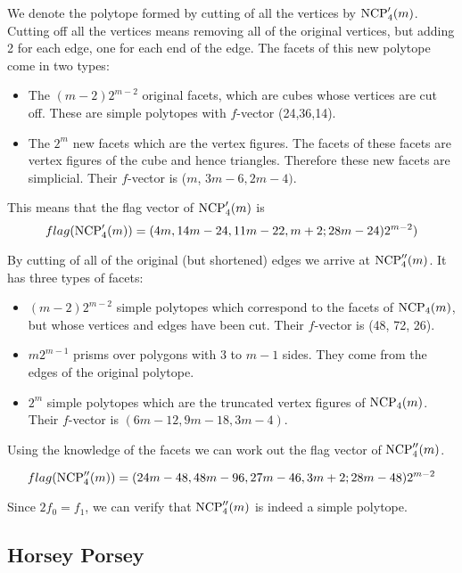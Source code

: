 We denote the polytope formed by cutting of all the vertices by $\textrm{NCP}'_4(m)$.
Cutting off all the vertices means removing all of the original vertices, but 
adding 2 for each edge, one for each end of the edge. The facets of this new 
polytope come in two types:

\begin{itemize}
 \item The $(m-2)2^{m-2}$ original facets, which are cubes whose vertices are 
cut off. These are simple polytopes with $f$-vector (24,36,14).
 \item The $2^m$ new facets which are the vertex figures. The facets of these 
facets are vertex figures of the cube and hence triangles. Therefore these 
new facets are simplicial. Their $f$-vector is ($m$, 
$3m-6, 2m-4)$.
\end{itemize}

This means that the flag vector of $\textrm{NCP}'_4(m)$ is 
\begin{equation}
 flag(\textrm{NCP}'_4(m)) = (4m, 14m-24, 11m-22, m+2; 28m-24)2^{m-2})
\end{equation}

By cutting of all of the original (but shortened) edges we arrive at 
$\textrm{NCP}''_4(m)$. It has three types of facets:

\begin{itemize}
 \item $(m-2)2^{m-2}$ simple polytopes which correspond to the facets of 
$\textrm{NCP}_4(m)$, but whose vertices and edges have been cut. Their $f$-vector is 
(48, 72, 26).
\item $m2^{m-1}$ prisms over polygons with $3$ to $m-1$ sides. They come from 
the edges of the original polytope.
\item $2^m$ simple polytopes which are the truncated vertex figures of 
$\textrm{NCP}_4(m)$. Their $f$-vector is $(6m - 12, 9m-18, 3m-4)$.
\end{itemize}

Using the knowledge of the facets we can work out the flag vector of 
$\textrm{NCP}''_4(m)$.

\begin{equation}
 flag(\textrm{NCP}''_4(m)) = (24m-48, 48m-96, 27m - 46, 3m+2; 28m -48)2^{m-2}
\end{equation}

Since $2f_0 = f_1$, we can verify that $\textrm{NCP}''_4(m)$ is indeed a simple 
polytope.

\subsection{Horsey Porsey}

